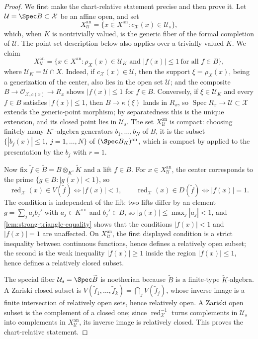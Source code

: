 \begin{proof}
We first make the chart-relative statement precise and then prove it.
Let $\mathcal U=\Spec B\subset\mathcal X$ be an affine open, and set
\[
 X^{\mathrm{an}}_{\mathcal U}
 =\{x\in X^{\mathrm{an}}:
   c_{\mathcal X}(x)\in\mathcal U_s\},
\]
which, when $K$ is nontrivially valued, is the generic fiber of the formal
completion of $\mathcal U$. The point-set description below also applies
over a trivially valued $K$. We claim
\[
 X^{\mathrm{an}}_{\mathcal U}
 =\{x\in X^{\mathrm{an}}:\rho_X(x)\in\mathcal U_K
   \text{ and }|f(x)|\leq1\ \text{for all }f\in B\},
\]
where $\mathcal U_K=\mathcal U\cap X$.  Indeed, if
$c_{\mathcal X}(x)\in\mathcal U$, then the support
$\xi=\rho_X(x)$, being a generization of the center, also lies in the
open set $\mathcal U$; and the composite
$B\to\mathcal O_{\mathcal X,c(x)}\to R_x$ shows $|f(x)|\leq1$ for
$f\in B$.  Conversely, if $\xi\in\mathcal U_K$ and every $f\in B$
satisfies $|f(x)|\leq1$, then $B\to\kappa(\xi)$ lands in $R_x$, so
$\operatorname{Spec}R_x\to\mathcal U\subset\mathcal X$ extends the
generic-point morphism; by separatedness this is the unique extension, and
its closed point lies in $\mathcal U_s$.  The set
$X^{\mathrm{an}}_{\mathcal U}$ is compact: choosing finitely many
$K^\circ$-algebra generators $b_1,\ldots,b_N$ of $B$, it is the
subset $\{|b_j(x)|\leq1,\ j=1,\ldots,N\}$ of
$(\Spec B_K)^{\mathrm{an}}$, which is compact by
 applied to the presentation by the
$b_j$ with $r=1$.

Now fix $\tilde f\in\widetilde B=B\otimes_{K^\circ}\widetilde K$ and a
lift $f\in B$.  For $x\in X^{\mathrm{an}}_{\mathcal U}$, the center
corresponds to the prime $\{g\in B:|g(x)|<1\}$, so
\[
 \operatorname{red}_{\mathcal X}(x)\in V(\tilde f)
 \iff|f(x)|<1,
 \qquad
 \operatorname{red}_{\mathcal X}(x)\in D(\tilde f)
 \iff|f(x)|=1 .
\]
The condition is independent of the lift: two lifts differ by an element
$g=\sum_ja_jb_j'$ with $a_j\in K^{\circ\circ}$ and $b_j'\in B$, so
$|g(x)|\leq\max_j|a_j|<1$, and \cref{lem:strong-triangle-equality}
shows that the conditions $|f(x)|<1$ and $|f(x)|=1$ are unaffected.
On $X^{\mathrm{an}}_{\mathcal U}$, the first displayed condition is a
strict inequality between continuous functions, hence defines a
relatively open subset; the second is the weak inequality
$|f(x)|\geq1$ inside the region $|f(x)|\leq1$, hence defines a
relatively closed subset.

The special fiber $\mathcal U_s=\Spec\widetilde B$ is noetherian
because $\widetilde B$ is a finite-type $\widetilde K$-algebra.  A
Zariski closed subset is $V(\tilde f_1,\ldots,\tilde f_k)
=\bigcap_jV(\tilde f_j)$, whose inverse image is a finite intersection
of relatively open sets, hence relatively open.  A Zariski open subset is
the complement of a closed one; since
$\operatorname{red}_{\mathcal X}^{-1}$ turns complements in
$\mathcal U_s$ into complements in $X^{\mathrm{an}}_{\mathcal U}$,
its inverse image is relatively closed.  This proves the chart-relative
statement.


\end{proof}
